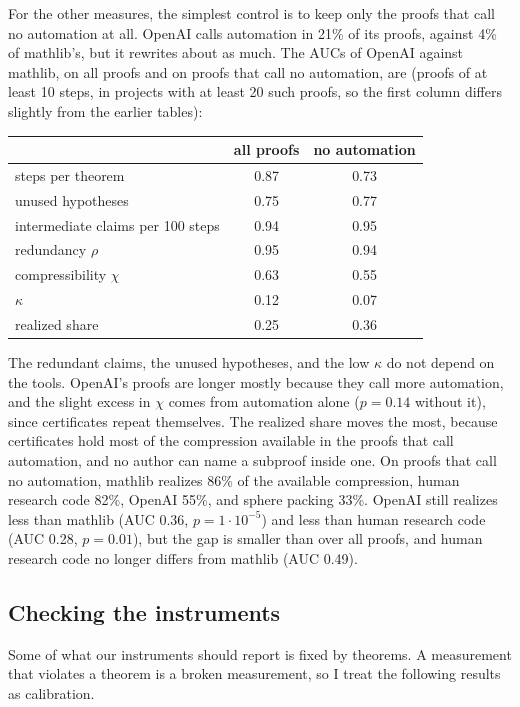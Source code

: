 \documentclass{article}
\begin{document}
For the other measures, the simplest control is to keep only the proofs that call no automation at all. OpenAI calls
automation in 21\% of its proofs, against 4\% of mathlib's, but it rewrites about as much. The AUCs of OpenAI against
mathlib, on all proofs and on proofs that call no automation, are (proofs of at least 10 steps, in projects with at
least 20 such proofs, so the first column differs slightly from the earlier tables):
\begin{center}
\begin{tabular}{lcc}
 & all proofs & no automation \\
\hline
steps per theorem & 0.87 & 0.73 \\
unused hypotheses & 0.75 & 0.77 \\
intermediate claims per 100 steps & 0.94 & 0.95 \\
redundancy $\rho$ & 0.95 & 0.94 \\
compressibility $\chi$ & 0.63 & 0.55 \\
$\kappa$ & 0.12 & 0.07 \\
realized share & 0.25 & 0.36 \\
\end{tabular}
\end{center}
The redundant claims, the unused hypotheses, and the low $\kappa$ do not depend on the tools. OpenAI's proofs are longer
mostly because they call more automation, and the slight excess in $\chi$ comes from automation alone ($p=0.14$ without
it), since certificates repeat themselves. The realized share moves the most, because certificates hold most of the compression
available in the proofs that call automation, and no author can name a subproof inside one. On proofs that call no
automation, mathlib realizes 86\% of the available compression, human research code 82\%, OpenAI 55\%, and sphere
packing 33\%. OpenAI still realizes less than mathlib (AUC 0.36, $p=1\cdot 10^{-5}$) and less than human research code
(AUC 0.28, $p=0.01$), but the gap is smaller than over all proofs, and human research code no longer differs from
mathlib (AUC 0.49).

\subsection{Checking the instruments}

Some of what our instruments should report is fixed by theorems. A measurement that violates a theorem is a broken
measurement, so I treat the following results as calibration.
\end{document}
